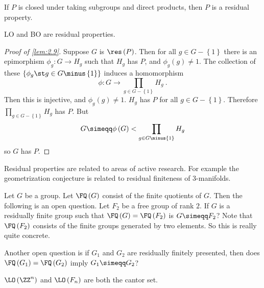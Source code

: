 \begin{lem}
If $P$ is closed under taking subgroups and direct products, then $P$ is a residual
property.
\label{lem:2.9}
\end{lem}

\begin{cor}
LO and BO are residual properties.
\label{cor:2.10}
\end{cor}

\begin{proof}[Proof of \cref{lem:2.9}]
Suppose $G$ is $\res\left(P\right)$. Then for all $g\in G\minus \left\{1\right\}$
there is an epimorphism $\phi_g : G\to H_g$ such that 
$H_g$ has $P$, and $\phi_g\left(g\right)\neq 1$.
The collection of these $\left\{\phi_g \st g\in G\minus \left\{1\right\}\right\}$ induces
a homomorphism
\begin{equation*}
\phi : G \to \prod_{g\in G\minus \left\{1\right\}} H_g
\ .
\end{equation*}
Then this is injective, and $\phi_g\left(g\right)\neq 1$.
$H_g$ has $P$ for all $g\in G\minus \left\{1\right\}$. Therefore $\prod_{g\in G\minus
\left\{1\right\}} H_g$ has $P$.
But 
\begin{equation*}
G\simeqq \phi\left(G\right)< \prod_{g\in G\minus \left\{1\right\}} H_g
\end{equation*}
so $G$ has $P$.
\end{proof}

\begin{rmk}
Residual properties are related to areas of  active research. For example the
geometrization conjecture is related to residual finiteness of $3$-manifolds.
\end{rmk}

\begin{rmk}
Let $G$ be a group. Let $\FQ\left(G\right)$ consist of the finite quotients of $G$.
Then the following is  an open question. Let $F_2$ be a free group of rank $2$. If $G$ is
a residually finite group  such that $\FQ\left(G\right) = \FQ\left(F_2\right)$ is
$G\simeqq F_2$?
Note that $\FQ\left(F_2\right)$ consists of the finite groups generated by two elements.
So this is really quite concrete.

Another open question is if $G_1$ and $G_2$ are residually finitely presented, then does
$\FQ\left(G_1\right) = \FQ\left(G_2\right)$ imply $G_1 \simeqq G_2$?
\end{rmk}

\begin{exm}
$\LO\left(\ZZ^n\right)$ and $\LO\left(F_n\right)$ are both the cantor set.
\end{exm}


